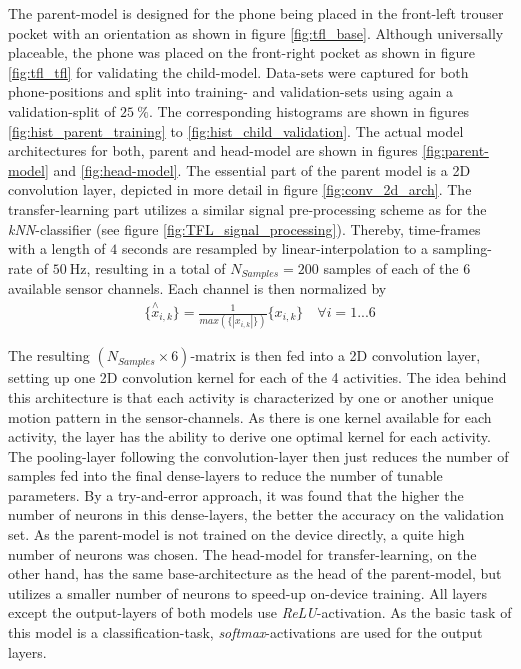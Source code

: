 \documentclass[journal]{IEEEtran}
\begin{document}
The parent-model is designed for the phone being placed in the front-left
trouser pocket with an orientation as shown in figure \ref{fig:tfl_base}.
Although universally placeable, the phone was placed on the front-right pocket as 
shown in figure \ref{fig:tfl_tfl} for validating the child-model.
Data-sets were captured for both phone-positions and split into
training- and validation-sets using again a validation-split of 
$25\ \si{\percent}$. The corresponding histograms are shown in 
figures \ref{fig:hist_parent_training} to \ref{fig:hist_child_validation}.
 \newline
The actual model architectures for both, parent and head-model are shown in
figures \ref{fig:parent-model} and \ref{fig:head-model}. The essential part of the
parent model is a 2D convolution layer, depicted in more detail in figure
\ref{fig:conv_2d_arch}. \newline
The transfer-learning part utilizes a similar signal
pre-processing scheme as for the \textit{kNN}-classifier 
(see figure \ref{fig:TFL_signal_processing}). Thereby, time-frames
with a length of $4$ seconds are resampled by linear-interpolation to a
sampling-rate of $50\ \si{\hertz}$, resulting in a total of $N_{Samples} = 200$
samples of each of the $6$ available sensor channels. Each channel is then 
normalized by 
\begin{align}
    \{\overset{\wedge}{x}_{i,k}\} = \frac{1}{\mathit{max}\left(\{|x_{i,k}|\}\right)}\{x_{i,k}\}\quad \forall i = 1 ... 6
\end{align}

The resulting $\left(N_{Samples}
\times 6\right)$-matrix is then fed into a 2D convolution layer, setting up
one 2D convolution kernel for each of the 4 activities. The idea behind this
architecture is that each activity is characterized by one or another unique
motion pattern in the sensor-channels. As there is one kernel available for
each activity, the layer has the ability to derive one optimal kernel for each
activity. The pooling-layer following the convolution-layer then just reduces the
number of samples fed into the final dense-layers to reduce the number of tunable parameters. 
By a try-and-error approach,
it was found that the higher the number of neurons in this dense-layers, the
better the accuracy on the validation set. As the parent-model is not trained on
the device directly, a quite high number of neurons was chosen. The head-model for
transfer-learning, on the other hand, has the same base-architecture as the head of
the parent-model, but utilizes a smaller number of neurons to speed-up on-device
training.\newline
All layers except the output-layers of both models use \textit{ReLU}-activation.
As the basic task of this model is a classification-task,
\textit{softmax}-activations are used for the output layers.
\end{document}
